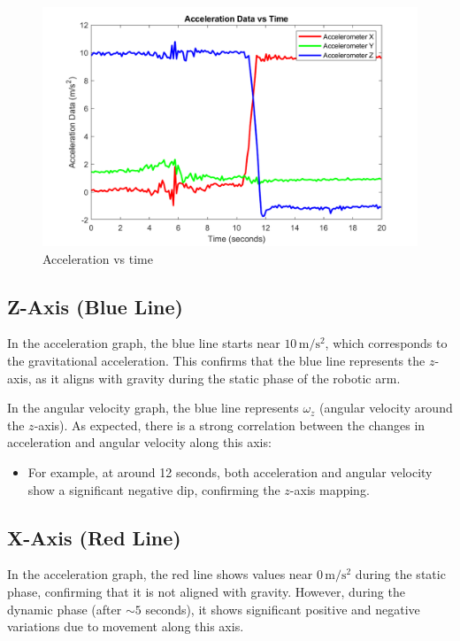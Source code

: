 \documentclass[12pt]{article}
\begin{document}
\begin{figure}[H]
    \centerline{\includegraphics[scale=0.7]{Imagens/acclerationvstime.png}}
    \caption{Acceleration vs time}
    \label{fig}
\end{figure}

\subsection*{Z-Axis (Blue Line)}

In the acceleration graph, the blue line starts near \(10 \, \mathrm{m/s^2}\), which corresponds to the gravitational acceleration. This confirms that the blue line represents the \(z\)-axis, as it aligns with gravity during the static phase of the robotic arm.

In the angular velocity graph, the blue line represents \(\omega_z\) (angular velocity around the \(z\)-axis). As expected, there is a strong correlation between the changes in acceleration and angular velocity along this axis:
\begin{itemize}
    \item For example, at around 12 seconds, both acceleration and angular velocity show a significant negative dip, confirming the \(z\)-axis mapping.
\end{itemize}

\subsection*{X-Axis (Red Line)}

In the acceleration graph, the red line shows values near \(0 \, \mathrm{m/s^2}\) during the static phase, confirming that it is not aligned with gravity. However, during the dynamic phase (after \(\sim 5\) seconds), it shows significant positive and negative variations due to movement along this axis.
\end{document}
